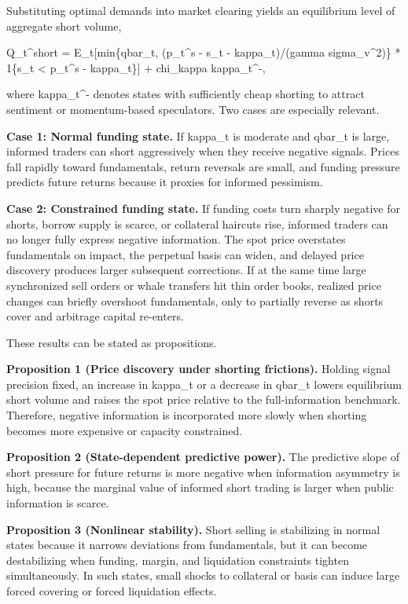 \documentclass[
]{article}
\begin{document}
Substituting optimal demands into market clearing yields an equilibrium
level of aggregate short volume,

Q\_t\^{}short = E\_t{[}min\{qbar\_t, (p\_t\^{}s - s\_t -
kappa\_t)/(gamma sigma\_v\^{}2)\} * 1\{s\_t \textless{} p\_t\^{}s -
kappa\_t\}{]} + chi\_kappa kappa\_t\^{}-,

where kappa\_t\^{}- denotes states with sufficiently cheap shorting to
attract sentiment or momentum-based speculators. Two cases are
especially relevant.

\textbf{Case 1: Normal funding state.} If kappa\_t is moderate and
qbar\_t is large, informed traders can short aggressively when they
receive negative signals. Prices fall rapidly toward fundamentals,
return reversals are small, and funding pressure predicts future returns
because it proxies for informed pessimism.

\textbf{Case 2: Constrained funding state.} If funding costs turn
sharply negative for shorts, borrow supply is scarce, or collateral
haircuts rise, informed traders can no longer fully express negative
information. The spot price overstates fundamentals on impact, the
perpetual basis can widen, and delayed price discovery produces larger
subsequent corrections. If at the same time large synchronized sell
orders or whale transfers hit thin order books, realized price changes
can briefly overshoot fundamentals, only to partially reverse as shorts
cover and arbitrage capital re-enters.

These results can be stated as propositions.

\textbf{Proposition 1 (Price discovery under shorting frictions).}
Holding signal precision fixed, an increase in kappa\_t or a decrease in
qbar\_t lowers equilibrium short volume and raises the spot price
relative to the full-information benchmark. Therefore, negative
information is incorporated more slowly when shorting becomes more
expensive or capacity constrained.

\textbf{Proposition 2 (State-dependent predictive power).} The
predictive slope of short pressure for future returns is more negative
when information asymmetry is high, because the marginal value of
informed short trading is larger when public information is scarce.

\textbf{Proposition 3 (Nonlinear stability).} Short selling is
stabilizing in normal states because it narrows deviations from
fundamentals, but it can become destabilizing when funding, margin, and
liquidation constraints tighten simultaneously. In such states, small
shocks to collateral or basis can induce large forced covering or forced
liquidation effects.
\end{document}
